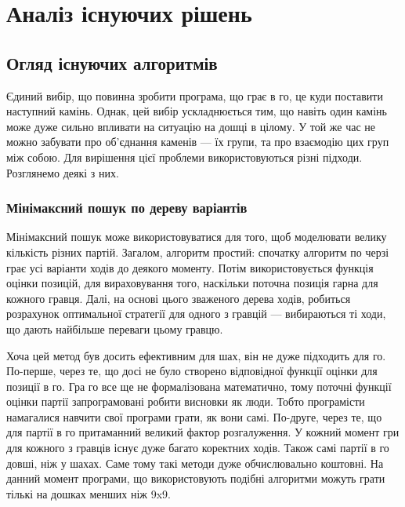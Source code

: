 \newpage
\section{Аналіз існуючих рішень}
\subsection{Огляд існуючих алгоритмів}
Єдиний вибір, що повинна зробити програма, що грає в го, це куди поставити наступний камінь. Однак, цей вибір ускладнюється тим, що навіть один камінь може дуже сильно впливати на ситуацію на дошці в цілому. У той же час не можно забувати про об'єднання каменів --- їх групи, та про взаємодію цих груп між собою. Для вирішення цієї проблеми використовуються різні підходи. Розглянемо деякі з них.
\subsubsection{Мінімаксний пошук по дереву варіантів}
Мінімаксний пошук може використовуватися для того, щоб моделювати велику кількість різних партій. Загалом, алгоритм простий: спочатку алгоритм по черзі грає усі варіанти ходів до деякого моменту. Потім використовується функція оцінки позицій, для вираховування того, наскільки поточна позиція гарна для кожного гравця. Далі, на основі цього зваженого дерева ходів, робиться розрахунок оптимальної стратегії для одного з гравцій --- вибираються ті ходи, що дають найбільше переваги цьому гравцю.

Хоча цей метод був досить ефективним для шах, він не дуже підходить для го. По-перше, через те, що досі не було створено відповідної функції оцінки для позиції в го. Гра го все ще не формалізована математично, тому поточні функції оцінки партії запрограмовані робити висновки як люди. Тобто програмісти намагалися навчити свої програми грати, як вони самі. По-друге, через те, що для партії в го притаманний великий фактор розгалуження. У кожний момент гри для кожного з гравців існує дуже багато коректних ходів. Також самі партії в го довші, ніж у шахах. Саме тому такі методи дуже обчислювально коштовні. На данний момент програми, що використовують подібні алгоритми можуть грати тількі на дошках менших ніж 9x9.

